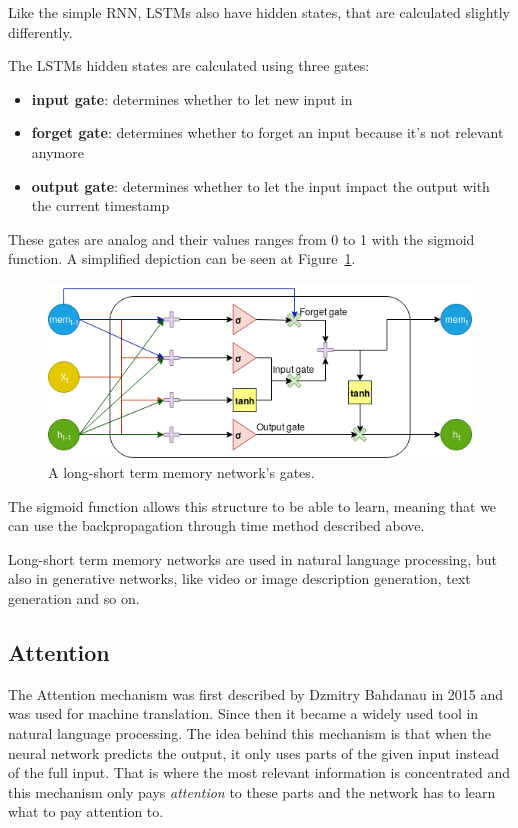 Like the simple RNN, LSTMs also have hidden states, that are calculated slightly differently.
\\

\begin{minipage}{\textwidth}
	The LSTMs hidden states are calculated using three gates:
	\begin{itemize}
		\item \textbf{input gate}: determines whether to let new input in
		\item \textbf{forget gate}: determines whether to forget an input because it's not relevant anymore
		\item \textbf{output gate}: determines whether to let the input impact the output with the current timestamp
	\end{itemize}
\end{minipage}

These gates are analog and their values ranges from 0 to 1 with the sigmoid function. A simplified depiction can be seen at Figure~\ref{fig:lstm}.
\begin{figure}[!ht]
	\centering
	\includegraphics[width=125mm, keepaspectratio]{figures/lstm.png}
	\caption{A long-short term memory network's gates.}
	\label{fig:lstm}
\end{figure}

The sigmoid function allows this structure to be able to learn, meaning that we can use the backpropagation through time method described above.

Long-short term memory networks are used in natural language processing, but also in generative networks, like video or image description generation, text generation and so on.

\subsection{Attention}
The Attention mechanism was first described by Dzmitry Bahdanau in 2015 \cite{Bahdanau:2015} and was used for machine translation. Since then it became a widely used tool in natural language processing. The idea behind this mechanism is that when the neural network predicts the output, it only uses parts of the given input instead of the full input. That is where the most relevant information is concentrated and this mechanism only pays \textit{attention} to these parts and the network has to learn what to pay attention to.


